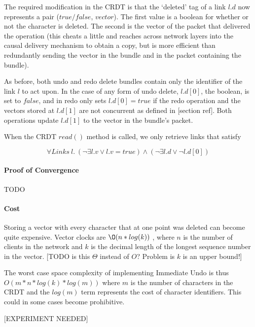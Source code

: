 \documentclass[12pt,a4paper,twoside,openright]{report}
\begin{document}
			The required modification in the CRDT is that the `deleted' tag of a link $l.d$ now represents a pair ($true/false$, $vector$). The first value is a boolean for whether or not the character is deleted. The second is the vector of the packet that delivered the operation (this cheats a little and reaches across network layers into the causal delivery mechanism to obtain a copy, but is more efficient than redundantly sending the vector in the bundle and in the packet containing the bundle).
			
			As before, both undo and redo delete bundles contain only the identifier of the link $l$ to act upon. In the case of any form of undo delete, $l.d[0]$, the boolean, is set to $false$, and in redo only sets $l.d[0] = true$ if the redo operation and the vectors stored at $l.d[1]$ are not concurrent as defined in [section ref]. Both operations update $l.d[1]$ to the vector in the bundle's packet.
			
			When the CRDT $read()$ method is called, we only retrieve links that satisfy
			
					\[\forall Links\ l.\  (\lnot\exists l.v \lor l.v = true) \land (\lnot\exists l.d \lor \lnot l.d[0]) \] 
						
			
			\paragraph{Proof of Convergence}
			
			TODO
			
			\paragraph{Cost}
			Storing a vector with every character that at one point was deleted can become quite expensive. Vector clocks are $\O(n*log(k))$ , where $n$ is the number of clients in the network and $k$ is the decimal length of the longest sequence number in the vector.
			[TODO is this $\Theta$ instead of $O$? Problem is $k$ is an upper bound!]
			
			The worst case space complexity of implementing Immediate Undo is thus $O(m*n*log(k)*log(m))$ where $m$ is the number of characters in the CRDT and the $log(m)$ term represents the cost of character identifiers. This could in some cases become prohibitive.
			
			[EXPERIMENT NEEDED]
			
			
			
			
		
\end{document}
